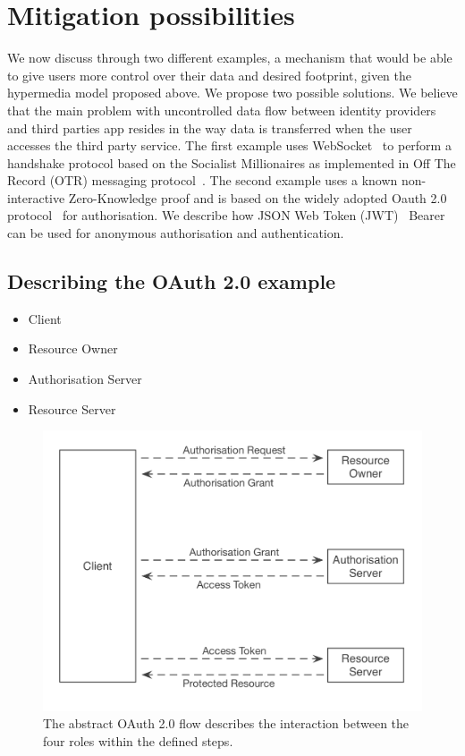 \section{Mitigation possibilities}

We now discuss through two different examples, a mechanism that would be able to give users more control over their data and desired footprint, given the hypermedia model proposed above. We propose two possible solutions. 
We believe that the main problem with uncontrolled data flow between identity providers and third parties app resides in the way data is transferred when the user accesses the third party service.
The first example uses WebSocket~\cite{fetterfc} to perform a handshake protocol based on the Socialist Millionaires as implemented in Off The Record (OTR) messaging protocol~\cite{goldberg2012off}. The second example uses a known non-interactive Zero-Knowledge proof and is based on the widely adopted Oauth 2.0 protocol~\cite{hardt2012oauth} for authorisation. We describe how JSON Web Token (JWT)~\cite{jones2015json} Bearer can be used for anonymous authorisation and authentication.

\subsection{Describing the OAuth 2.0 example}

\begin{itemize}
    \item Client
    \item Resource Owner
    \item Authorisation Server
    \item Resource Server
\end{itemize}

\begin{figure}
\includegraphics[width=\textwidth]{figures/OAuth2Flow.png}
\caption[OAuth 2.0 Flow.]{The abstract OAuth 2.0 flow describes the interaction between the four roles within the defined steps.
\label{fig:oauth2flow}}
\end{figure}

